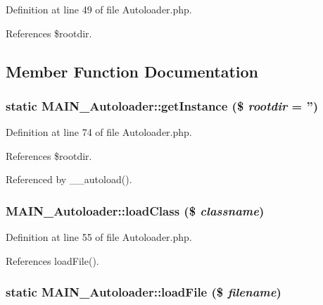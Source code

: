 Definition at line 49 of file Autoloader.php.

References \$rootdir.

\subsection{Member Function Documentation}
\hypertarget{classMAIN__Autoloader_aa3acf8b51f564e1d79d622b6e5fcf1a4}{
\subsubsection[{getInstance}]{\setlength{\rightskip}{0pt plus 5cm}static MAIN\_\-Autoloader::getInstance (\$ {\em rootdir} = {\ttfamily ''})}}
\label{dd/d71/classMAIN__Autoloader_aa3acf8b51f564e1d79d622b6e5fcf1a4}


Definition at line 74 of file Autoloader.php.

References \$rootdir.

Referenced by \_\-\_\-autoload().\hypertarget{classMAIN__Autoloader_a58a2d3299366e703eebd60192d927ed9}{
\subsubsection[{loadClass}]{\setlength{\rightskip}{0pt plus 5cm}MAIN\_\-Autoloader::loadClass (\$ {\em classname})}}
\label{dd/d71/classMAIN__Autoloader_a58a2d3299366e703eebd60192d927ed9}


Definition at line 55 of file Autoloader.php.

References loadFile().\hypertarget{classMAIN__Autoloader_a458b2d4ca327f7e614a9f99e7df23ba7}{
\subsubsection[{loadFile}]{\setlength{\rightskip}{0pt plus 5cm}static MAIN\_\-Autoloader::loadFile (\$ {\em filename})}}
\label{dd/d71/classMAIN__Autoloader_a458b2d4ca327f7e614a9f99e7df23ba7}


